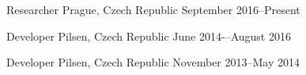 

\begin{cventries}

  \cventry
    {Researcher} %
    {} %
    {Prague, Czech Republic} %
    {September 2016--Present} %
    {}

  \cventry
    {Developer} %
    {} %
    {Pilsen, Czech Republic} %
    {June 2014-–August 2016} %
    {}

  \cventry
    {Developer} %
    {} %
    {Pilsen, Czech Republic} %
    {November 2013--May 2014} %
    {}


\end{cventries}

